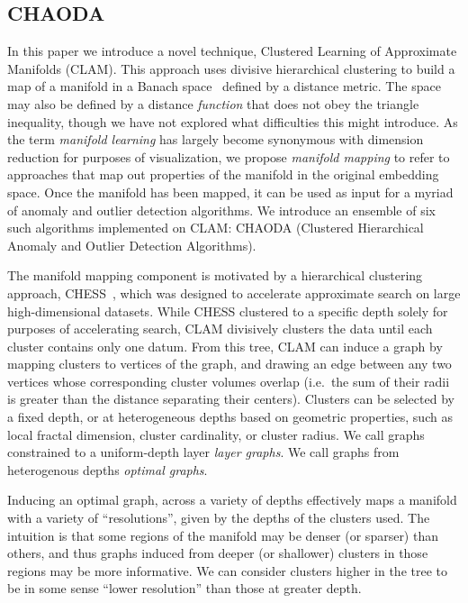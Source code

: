 \subsection{CHAODA}
\label{subsec:introduction:chaoda}

In this paper we introduce a novel technique, Clustered Learning of Approximate Manifolds (CLAM).
This approach uses divisive hierarchical clustering to build a map of a manifold in a Banach space~\cite{banach1929fonctionnelles} defined by a distance metric.
The space may also be defined by a distance \textit{function} that does not obey the triangle inequality, though we have not explored what difficulties this might introduce.
As the term \emph{manifold learning} has largely become synonymous with dimension reduction for purposes of visualization, we propose \emph{manifold mapping} to refer to approaches that map out properties of the manifold in the original embedding space.
Once the manifold has been mapped, it can be used as input for a myriad of anomaly and outlier detection algorithms.
We introduce an ensemble of six such algorithms implemented on CLAM: CHAODA (Clustered Hierarchical Anomaly and Outlier Detection Algorithms).

The manifold mapping component is motivated by a hierarchical clustering approach, CHESS~\cite{ishaq2019clustered}, which was designed to accelerate approximate search on large high-dimensional datasets.
While CHESS clustered to a specific depth solely for purposes of accelerating search, CLAM
divisively clusters the data until each cluster contains only one datum.
From this tree, CLAM can induce a graph by mapping clusters to vertices of the graph, and drawing an edge between any two vertices whose corresponding cluster volumes overlap (i.e.\ the sum of their radii is greater than the distance separating their centers).
Clusters can be selected by a fixed depth, or at heterogeneous depths based on geometric properties, such as local fractal dimension, cluster cardinality, or cluster radius.
We call graphs constrained to a uniform-depth layer \textit{layer graphs}.
We call graphs from heterogenous depths \textit{optimal graphs}.

Inducing an optimal graph, across a variety of depths effectively maps a manifold with a variety of ``resolutions'', given by the depths of the clusters used.
The intuition is that some regions of the manifold may be denser (or sparser) than others, and thus graphs induced from deeper (or shallower) clusters in those regions may be more informative.
We can consider clusters higher in the tree to be in some sense ``lower resolution'' than those at greater depth.

